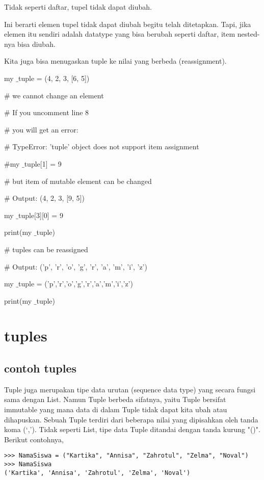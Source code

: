 Tidak seperti daftar, tupel tidak dapat diubah. \par
\vspace{12pt}
Ini berarti elemen tupel tidak dapat diubah begitu telah ditetapkan. Tapi, jika elemen itu sendiri adalah datatype yang bisa berubah seperti daftar, item nested-nya bisa diubah. \par
\vspace{12pt}
Kita juga bisa menugaskan tuple ke nilai yang berbeda (reassignment). \par
\vspace{12pt}
my $  \_  $tuple = (4, 2, 3, [6, 5]) \par
\vspace{12pt}
 $  \#  $ we cannot change an element \par
 $  \#  $ If you uncomment line 8 \par
 $  \#  $ you will get an error: \par
 $  \#  $ TypeError: 'tuple' object does not support item assignment \par
\vspace{12pt}
 $  \#  $my $  \_  $tuple[1] = 9 \par
\vspace{12pt}
 $  \#  $ but item of mutable element can be changed \par
 $  \#  $ Output: (4, 2, 3, [9, 5]) \par
my $  \_  $tuple[3][0] = 9 \par
print(my $  \_  $tuple) \par
\vspace{12pt}
 $  \#  $ tuples can be reassigned \par
 $  \#  $ Output: ('p', 'r', 'o', 'g', 'r', 'a', 'm', 'i', 'z') \par
my $  \_  $tuple = ('p','r','o','g','r','a','m','i','z') \par
print(my $  \_  $tuple) \par
\section {tuples}
\subsection {contoh tuples}
Tuple juga merupakan tipe data urutan (sequence data type) yang secara fungsi sama dengan List. Namun Tuple berbeda sifatnya, yaitu Tuple bersifat immutable yang mana data di dalam Tuple tidak dapat kita ubah atau dihapuskan. Sebuah Tuple terdiri dari beberapa nilai yang dipisahkan oleh tanda koma (‘,’). Tidak seperti List, tipe data Tuple ditandai dengan tanda kurung "()". Berikut contohnya,
\begin{verbatim}
>>> NamaSiswa = ("Kartika", "Annisa", "Zahrotul", "Zelma", "Noval")
>>> NamaSiswa
('Kartika', 'Annisa', 'Zahrotul', 'Zelma', 'Noval')
\end{verbatim}

